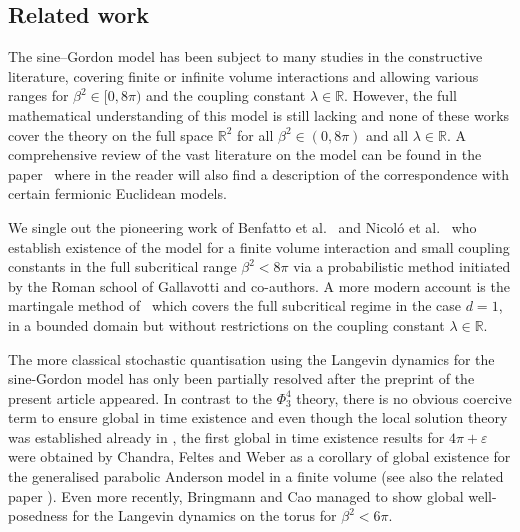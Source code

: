 \documentclass[11pt, a4paper]{scrartcl}
\numberwithin{equation}{section}
\theoremstyle{plain}
\theoremstyle{remark}
\begin{document}
\subsection{Related work}

The sine--Gordon model has been subject to many studies in the constructive
literature, covering finite or infinite volume interactions and allowing
various ranges for $\beta^2 \in [0, 8 \pi)$ and the coupling constant $\lambda
	\in \mathbb{R}$. However, the full mathematical understanding of this model is
still lacking and none of these works cover the theory on the full space
$\mathbb{R}^2$ for all $\beta^2 \in (0, 8 \pi)$ and all $\lambda \in
	\mathbb{R}$. A comprehensive review of the vast literature on the model can be found in the
paper~{\cite{bauerschmidtColemanCorrespondenceFree2023}} where in the reader
will also find a description of the correspondence with certain fermionic
Euclidean models.

We single out the pioneering work of Benfatto et
al.~{\cite{benfattoMassiveSineGordonEquation1982}} and Nicol{\'o} et
al.~{\cite{nicoloMassiveSineGordonEquation1986}} who establish existence of
the model for a finite volume interaction and small coupling constants in the
full subcritical range $\beta^2 < 8 \pi$ via a probabilistic method initiated
by the Roman school of Gallavotti and co-authors. A more modern account is the
martingale method of~{\cite{lacoinProbabilisticApproachUltraviolet2022}} which
covers the full subcritical regime in the case $d = 1$, in a bounded domain
but without restrictions on the coupling constant $\lambda \in \mathbb{R}$.

The more classical stochastic quantisation using the Langevin dynamics for the
sine-Gordon model has only been partially resolved after the preprint of
the present article appeared. In contrast to the $\Phi^4_3$ theory, there is no
obvious coercive term to ensure global in time existence and even though the
local solution theory was established already in
\cite{hairerDynamicalSineGordonModel2016,chandraDynamicalSineGordonModel2018},
the first global in time existence results for $4\pi+\varepsilon$ were obtained by Chandra, Feltes and
Weber \cite{chandraPrioriBounds2d2024} as a corollary of global existence for the generalised parabolic Anderson model in a finite volume
(see also the related paper \cite{shenGlobalWellposedness2D2025}).
Even more recently, Bringmann and Cao \cite{bringmannGlobalWellposednessDynamical2024}
managed to show global well-posedness for the Langevin dynamics on the torus for $\beta^2<6\pi$.
\end{document}
